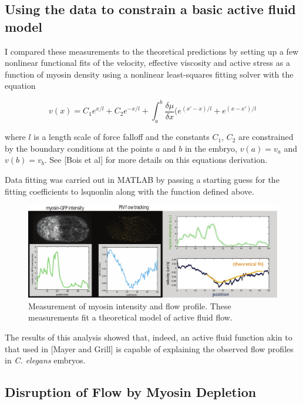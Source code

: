 \subsection{Using the data to constrain a basic active fluid model}
I compared these measurements to the theoretical predictions by setting up a few nonlinear
functional fits of the velocity, effective viscosity and active stress as a function of myosin
density using a nonlinear least-squares fitting solver with the equation

\begin{equation}
v(x) = C_1 e^{x/l}+C_2 e^{-x/l}+ \int_{a}^{b} \frac{\delta\mu}{\delta x}(e^{(x'-x)/l}+e^{(x-x')/l}
\end{equation}

where $l$ is a length scale of force falloff and the constants $C_1$, $C_2$ are constrained by the boundary conditions at the points $a$ and $b$ in the embryo, $v(a) = v_a$ and $v(b)=v_b$.  See [Bois et al] for more details on this equations derivation.

Data fitting was carried out in MATLAB by passing a starting guess for the fitting coefficients to lsqnonlin along with the function defined above. 


\begin{figure}[h!]
	\centering
	\includegraphics[width=\hsize]{data/prelim_flow.pdf}
	\caption{\label{fig:measure_flow}  Measurement of myosin intensity and flow profile.  These measurements fit a theoretical model of active fluid flow.  }
\end{figure}

The results of this analysis showed that, indeed, an active fluid function akin to that used in [Mayer and Grill] is capable of explaining the observed flow profiles in \textit{C. elegans} embryos.  


\subsection{Disruption of Flow by Myosin Depletion}

